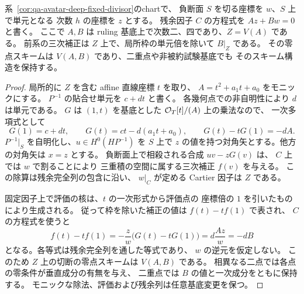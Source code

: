 \begin{corollary}[交差因子上の三次補正の方程式]
\label{cor:qa-avatar-deep-cubic-values}
系~\ref{cor:qa-avatar-deep-fixed-divisor}のchartで、
負断面 $S$ を切る座標を $w$、$S$ 上で単元となる
次数 $h$ の座標を $z$ とする。
残余因子 $C$ の方程式を $Az+Bw=0$ と書く。
ここで $A,B$ は ruling 基底上で次数二、四であり、$Z=V(A)$ である。
前系の三次補正は $Z$ 上で、局所枠の単元倍を除いて $B|_Z$ である。
その零点スキームは $V(A,B)$ であり、二重点や非被約試験基底でも
そのスキーム構造を保持する。
\end{corollary}
\begin{proof}
局所的に $Z$ を含む affine 直線座標 $t$ を取り、
$A=t^2+a_1t+a_0$ をモニックにする。
$P^{-1}$ の貼合せ単元を $c+dt$ と書く。
各幾何点での非自明性により $d$ は単元である。
$G$ は $(1,t)$ を基底とした $\mathcal O_T[t]/(A)$ 上の乗法なので、
一次多項式として
\[
 G(1)=c+dt,\qquad G(t)=ct-d(a_1t+a_0),\qquad
 G(t)-tG(1)=-dA.
\]
$P^{-1}|_S$ を自明化し、$u\in H^0(HP^{-1})$ を
$S$ 上で $z$ の値を持つ対角矢とする。他方の対角矢は $x=z$ とする。
負断面上で相殺される合成 $uv-zG(v)$ は、
$C$ 上では $w$ で割ることにより
三重積の空間に属する三次補正 $f(v)$ を与える。
この除算は残余完全列の包含に沿い、
$w|_C$ が定める Cartier 因子は $Z$ である。

固定因子上で評価の核は、$t$ の一次形式から評価点の
座標倍の $1$ を引いたものにより生成される。
従って枠を除いた補正の値は $f(t)-t f(1)$ で表され、
$C$ の方程式を使うと
\[
 f(t)-t f(1)
 =-\frac{z}{w}\bigl(G(t)-tG(1)\bigr)
 =d\frac{Az}{w}
 =-dB
\]
となる。各等式は残余完全列を通した等式であり、
$w$ の逆元を仮定しない。
このため $Z$ 上の切断の零点スキームは $V(A,B)$ である。
相異なる二点では各点の零条件が垂直成分の有無を与え、
二重点では $B$ の値と一次成分をともに保持する。
モニックな除法、評価および残余列は任意基底変更を保つ。
\end{proof}

